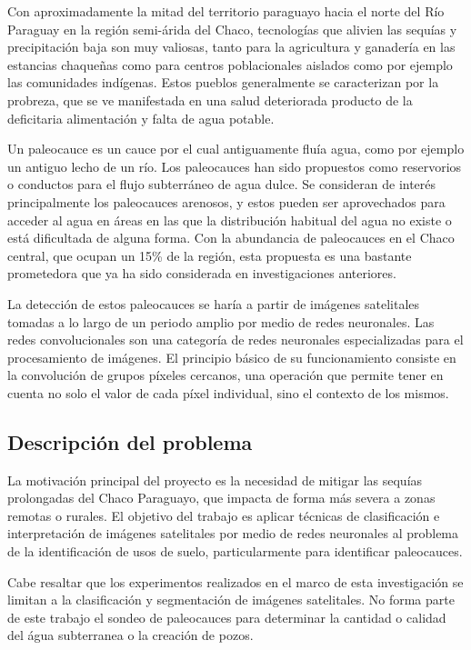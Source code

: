 Con aproximadamente la mitad del territorio paraguayo hacia el norte del Río Paraguay en la región semi-árida del Chaco, tecnologías que alivien las sequías y precipitación baja son muy valiosas, tanto para la agricultura y ganadería en las estancias chaqueñas como para centros poblacionales aislados como por ejemplo las comunidades indígenas. Estos pueblos generalmente se caracterizan por la probreza, que se ve manifestada en una salud deteriorada producto de la deficitaria alimentación y falta de agua potable.

Un paleocauce es un cauce por el cual antiguamente fluía agua, como por ejemplo un antiguo lecho de un río. Los paleocauces han sido propuestos como reservorios o conductos para el flujo subterráneo de agua dulce. Se consideran de interés principalmente los paleocauces arenosos, y estos pueden ser aprovechados para acceder al agua en áreas en las que la distribución habitual del agua no existe o está dificultada de alguna forma. \autocite{wikipedia-paleochannel} Con la abundancia de paleocauces en el Chaco central, que ocupan un 15\% de la región, esta propuesta es una bastante prometedora que ya ha sido considerada en investigaciones anteriores. \autocite{conacyt-sistemas-captacion-agua}

La detección de estos paleocauces se haría a partir de imágenes satelitales tomadas a lo largo de un periodo amplio por medio de redes neuronales. Las redes convolucionales son una categoría de redes neuronales especializadas para el procesamiento de imágenes. El principio básico de su funcionamiento consiste en la convolución de grupos píxeles cercanos, una operación que permite tener en cuenta no solo el valor de cada píxel individual, sino el contexto de los mismos. \autocite{axiv-cnn-satellite-imaging}

\subsection{Descripción del problema}
La motivación principal del proyecto es la necesidad de mitigar las sequías prolongadas del Chaco Paraguayo, que impacta de forma más severa a zonas remotas o rurales. El objetivo del trabajo es aplicar técnicas de clasificación e interpretación de imágenes satelitales por medio de redes neuronales al problema de la identificación de usos de suelo, particularmente para identificar paleocauces.

Cabe resaltar que los experimentos realizados en el marco de esta investigación se limitan a la clasificación y segmentación de imágenes satelitales. No forma parte de este trabajo el sondeo de paleocauces para determinar la cantidad o calidad del água subterranea o la creación de pozos.

